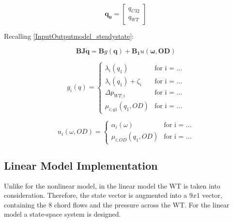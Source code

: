 \begin{equation}
\pmb{q_0} =
\begin{bmatrix}
         q_{C32} \\
	q_{WT}
\end{bmatrix}
\label{qvector}
\end{equation}

Recalling \eqref{InputOutputmodel_steadystate}:

\begin{equation}
 \pmb{B}\pmb{J} \pmb{\dot{q}} = \pmb{B} g(\pmb{q})+ \pmb{B_1} u(\pmb{\omega},\pmb{OD})
 \label{InputOutputmodel_steadystate_linmodel}
\end{equation}

\begin{equation}
\label{gfunction}
 g_{i}(q) =
		\left\{
		\begin{array}{ll}
		
		\lambda_i(q_1) 			&      \text{for i = ...}	
\\
		\lambda_i(q_1) + \zeta_i                      &     \text{for i = ...}
\\

                \Delta p_{WT;i}                       &      \text{for i = ...}
\\

                \mu_{i;q1}(q_1, OD)                       &      \text{for i = ...}

		\end{array}
		\right.
\end{equation}	

\begin{equation}
\label{ufunction}
 u_{i}(\omega, OD) =
		\left\{
		\begin{array}{ll}
		
		\alpha_i(\omega) 			&      \text{for i = ...}	
\\
		\mu_{i;OD}(q_1, OD)                      &     \text{for i = ...}

		\end{array}
		\right.
\end{equation}	



\subsection{Linear Model Implementation}
\label{MatlabScriptLinear}

Unlike for the nonlinear model, in the linear model the WT is taken into consideration. Therefore, the state vector is augmented into a $9x1$ vector, 
containing the 8 chord flows and the pressure across the WT. For the linear model a state-space system is designed.


